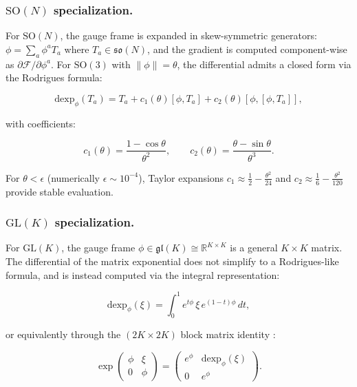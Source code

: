 \documentclass[twoside,11pt]{article}
\begin{document}
\subsubsection{$\mathrm{SO}(N)$ specialization.}

For $\mathrm{SO}(N)$, the gauge frame is expanded in skew-symmetric generators: $\phi = \sum_a \phi^a T_a$ where $T_a \in \mathfrak{so}(N)$, and the gradient is computed component-wise as $\partial \mathcal{F}/\partial \phi^a$. For $\mathrm{SO}(3)$ with $\|\phi\| = \theta$, the differential admits a closed form via the Rodrigues formula:

\begin{equation}
\mathrm{dexp}_\phi(T_a) = T_a + c_1(\theta)[\phi, T_a] + c_2(\theta)[\phi, [\phi, T_a]],
\label{eq:dexp_so3}
\end{equation}

with coefficients:

\begin{equation}
c_1(\theta) = \frac{1 - \cos\theta}{\theta^2}, \qquad c_2(\theta) = \frac{\theta - \sin\theta}{\theta^3}.
\end{equation}

For $\theta < \epsilon$ (numerically $\epsilon \sim 10^{-4}$), Taylor expansions $c_1 \approx \frac{1}{2} - \frac{\theta^2}{24}$ and $c_2 \approx \frac{1}{6} - \frac{\theta^2}{120}$ provide stable evaluation.

\subsubsection{$\mathrm{GL}(K)$ specialization.}

For $\mathrm{GL}(K)$, the gauge frame $\phi \in \mathfrak{gl}(K) \cong \mathbb{R}^{K \times K}$ is a general $K \times K$ matrix. The differential of the matrix exponential does not simplify to a Rodrigues-like formula, and is instead computed via the integral representation:

\begin{equation}
\mathrm{dexp}_\phi(\xi) = \int_0^1 e^{t\phi} \, \xi \, e^{(1-t)\phi} \, dt,
\label{eq:dexp_integral}
\end{equation}

or equivalently through the $(2K \times 2K)$ block matrix identity \citep{higham2008functions}:

\begin{equation}
\exp\!\begin{pmatrix} \phi & \xi \\ 0 & \phi \end{pmatrix}
= \begin{pmatrix} e^\phi & \mathrm{dexp}_\phi(\xi) \\ 0 & e^\phi \end{pmatrix}.
\label{eq:dexp_block}
\end{equation}
\end{document}
